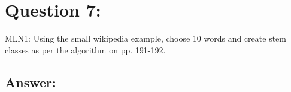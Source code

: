\section*{Question 7:}
MLN1: Using the small wikipedia example, choose 10 words and create stem classes as per the algorithm on pp. 191-192.

\subsection*{Answer:}
